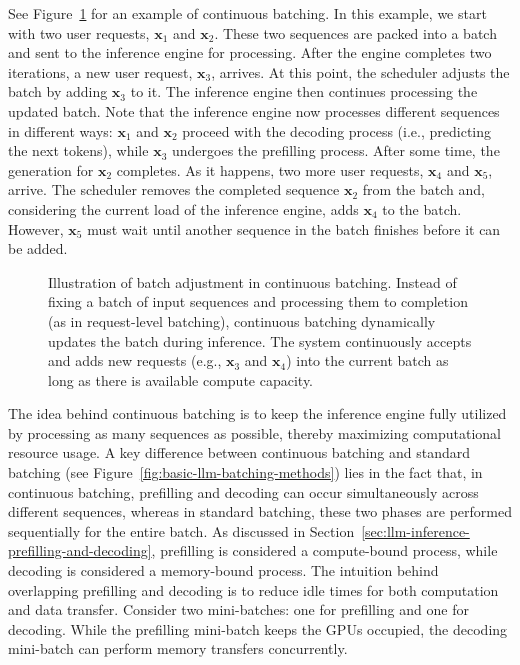 \vspace{0.5em}

See Figure~\ref{fig:llm-continuous-batching} for an example of continuous batching. In this example, we start with two user requests,  $\mathbf{x}_1$ and $\mathbf{x}_2$. These two sequences are packed into a batch and sent to the inference engine for processing. After the engine completes two iterations, a new user request, $\mathbf{x}_3$, arrives. At this point, the scheduler adjusts the batch by adding $\mathbf{x}_3$ to it. The inference engine then continues processing the updated batch. Note that the inference engine now processes different sequences in different ways: $\mathbf{x}_1$ and $\mathbf{x}_2$ proceed with the decoding process (i.e., predicting the next tokens), while $\mathbf{x}_3$ undergoes the prefilling process. After some time, the generation for $\mathbf{x}_2$ completes. As it happens, two more user requests, $\mathbf{x}_4$ and $\mathbf{x}_5$, arrive. The scheduler removes the completed sequence $\mathbf{x}_2$ from the batch and, considering the current load of the inference engine, adds $\mathbf{x}_4$ to the batch. However, $\mathbf{x}_5$ must wait until another sequence in the batch finishes before it can be added.

\begin{figure}[!t]
\centering

\vspace{-0.5cm} \caption{Illustration of batch adjustment in continuous batching. Instead of fixing a batch of input sequences and processing them to completion (as in request-level batching), continuous batching dynamically updates the batch during inference. The system continuously accepts and adds new requests (e.g., $\mathbf{x}_3$ and $\mathbf{x}_4$) into the current batch as long as there is available compute capacity.}
\label{fig:llm-continuous-batching}
\end{figure}

The idea behind continuous batching is to keep the inference engine fully utilized by processing as many sequences as possible, thereby maximizing computational resource usage. A key difference between continuous batching and standard batching (see Figure~\ref{fig:basic-llm-batching-methods}) lies in the fact that, in continuous batching, prefilling and decoding can occur simultaneously across different sequences, whereas in standard batching, these two phases are performed sequentially for the entire batch. As discussed in Section~\ref{sec:llm-inference-prefilling-and-decoding}, prefilling is considered a compute-bound process, while decoding is considered a memory-bound process. The intuition behind overlapping prefilling and decoding is to reduce idle times for both computation and data transfer. Consider two mini-batches: one for prefilling and one for decoding. While the prefilling mini-batch keeps the GPUs occupied, the decoding mini-batch can perform memory transfers concurrently.


